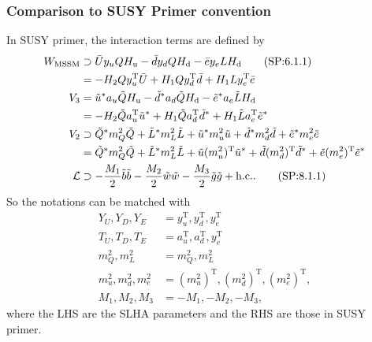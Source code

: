 \documentclass[a4paper,11pt,captions=tableheading,DIV=12]{scrartcl}
\newcommand\w[1]{_{\mathrm{#1}}}
\newcommand{\tra}{^{\mathrm T}}
\begin{document}
\subsubsection{Comparison to SUSY Primer convention}
In SUSY primer, the interaction terms are defined by
\begin{align}
 W\w{MSSM}
&\supset \bar U y_u Q H\w u - \bar d y_d Q H\w d - \bar e y_e L H\w d
\tag{SP:6.1.1}\\
&=
 -H_2Q y_u\tra \bar U + H_1 Qy_d\tra\bar d  +H_1 Ly_e\tra\bar e
\notag\\
V_3 &=
 \tilde u^* a_u \tilde Q H\w u
-\tilde d^* a_d \tilde Q H\w d
-\tilde e^* a_e \tilde L H\w d
\notag\\
&=
-H_2 \tilde Q a_u\tra \tilde u^*
+H_1 \tilde Q a_d\tra \tilde d^*
+H_1 \tilde L a_e\tra \tilde e^*
\notag\\
V_2 &\supset
 \tilde Q^* m_Q^2 \tilde Q
+\tilde L^* m_L^2 \tilde L
+\tilde u^* m_u^2 \tilde u
+\tilde d^* m_d^2 \tilde d
+\tilde e^* m_e^2 \tilde e
\notag\\
&=
 \tilde Q^* m_Q^2 \tilde Q
+\tilde L^* m_L^2 \tilde L
+\tilde u (m_u^2)\tra \tilde u^*
+\tilde d (m_d^2)\tra \tilde d^*
+\tilde e (m_e^2)\tra \tilde e^*
\notag\\
\mathcal L&\supset
-\frac{M_1}{2}\tilde b\tilde b-\frac{M_2}{2}\tilde w\tilde w-\frac{M_3}{2}\tilde g\tilde g + \text{h.c.}.\tag{SP:8.1.1}
\end{align}
So the notations can be matched with
\begin{align}
 Y_U, Y_D, Y_E &= y_u\tra, y_d\tra, y_e\tra\\
 T_U, T_D, T_E &= a_u\tra, a_d\tra, y_e\tra\\
 m_Q^2, m_L^2  &= m_Q^2, m_L^2\\
 m_u^2, m_d^2, m_e^2  &= (m_u^2)\tra,(m_d^2)\tra,(m_e^2)\tra,\\
 M_1, M_2, M_3 &= -M_1, -M_2, -M_3,
\end{align}
where the LHS are the SLHA parameters and the RHS are those in SUSY primer.
\end{document}
